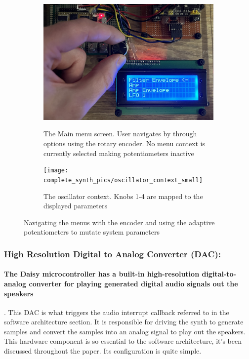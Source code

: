 \documentclass[acmlarge,screen]{acmart}
\begin{document}
	\begin{figure}[H]
		\centering
		\begin{subfigure}{.5\textwidth}
			\centering
			\caption{The Main menu screen. User navigates by through options using the rotary encoder. No menu context is currently selected making potentiometers inactive}
			\includegraphics[width=.9\linewidth]{complete_synth_pics/menu_navigation}
			\label{fig:sub1}
		\end{subfigure}%
		\begin{subfigure}{.5\textwidth}
			\centering
			\caption{The oscillator context. Knobs 1-4 are mapped to the displayed parameters}
			\texttt{[image: complete\_synth\_pics/oscillator\_context\_small]}
			\label{fig:sub2}
		\end{subfigure}
		\caption{Navigating the menus with the encoder and using the adaptive potentiometers to mutate system parameters}
		\label{fig:test}
	\end{figure}	

	\subsubsection{High Resolution Digital to Analog Converter (DAC):} 
	\paragraph{The Daisy microcontroller has a built-in high-resolution digital-to-analog converter for playing generated digital audio signals out the speakers}. This DAC is what triggers the audio interrupt callback referred to in the software architecture section. It is responsible for driving the synth to generate samples and convert the samples into an analog signal to play out the speakers. This hardware component is so essential to the software architecture, it's been discussed throughout the paper. Its configuration is quite simple.
	
\end{document}

